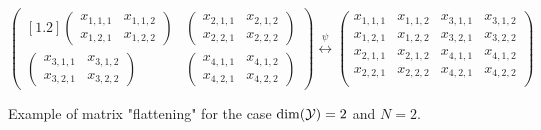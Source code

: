 \begin{figure}
	\centering
	$
		\begin{pmatrix}[1.2]
			\begin{pmatrix}
				x_{1, 1, 1} & x_{1, 1, 2}\\
				x_{1, 2, 1} & x_{1, 2, 2}
			\end{pmatrix}
			& \begin{pmatrix}
				x_{2, 1, 1} & x_{2, 1, 2}\\
				x_{2, 2, 1} & x_{2, 2, 2}
			\end{pmatrix}\\
			\begin{pmatrix}
			x_{3, 1, 1} & x_{3, 1, 2}\\
			x_{3, 2, 1} & x_{3, 2, 2}
			\end{pmatrix} 
			& \begin{pmatrix}
			x_{4, 1, 1} & x_{4, 1, 2}\\
			x_{4, 2, 1} & x_{4, 2, 2}
			\end{pmatrix}
		\end{pmatrix}
		\stackrel{\psi}{\longleftrightarrow}
		\begin{pmatrix}
			x_{1, 1, 1} & x_{1, 1, 2} & x_{3, 1, 1} & x_{3, 1, 2} \\
			x_{1, 2, 1} & x_{1, 2, 2} & x_{3, 2, 1} & x_{3, 2, 2} \\
			x_{2, 1, 1} & x_{2, 1, 2} & x_{4, 1, 1} & x_{4, 1, 2} \\
			x_{2, 2, 1} & x_{2, 2, 2} & x_{4, 2, 1} & x_{4, 2, 2} \\
		\end{pmatrix}
	$
	\caption{Example of matrix "flattening" for the case $\mathrm{dim}(\mathcal{Y}) = 2$ and $N = 2$.}
	\label{fig:block-operator-example}
\end{figure}